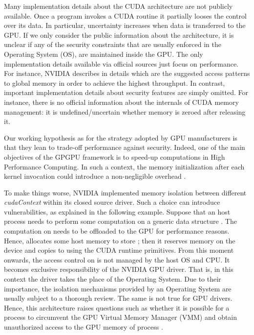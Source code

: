 \documentclass[11pt,onecolumn,letterpaper]{IEEEtran}
\begin{document}
Many implementation details about the CUDA architecture are not publicly available. 
Once a program invokes a CUDA routine it partially looses the control over its data. 
In particular, uncertainty increases when data is transferred to the GPU. 
If we only consider the public information about the architecture, 
it is unclear if any of the security constraints that are usually enforced in the Operating System (OS), 
are maintained inside the GPU.
The only implementation details available via official sources just focus on performance. 
For instance, NVIDIA describes in details which are the suggested access patterns to global memory in order to achieve the highest throughput.
In contrast, important implementation details about security features are simply omitted.
For instance,  there is no official information about the internals of CUDA memory management: it is undefined/uncertain whether memory is zeroed \cite{zeroizzazione2} after releasing it.

Our working hypothesis as for the strategy adopted by GPU manufacturers is that they lean to trade-off performance against security.
Indeed, one of the main objectives of the GPGPU framework is to speed-up computations in High Performance Computing.
In such a context, the memory initialization after each kernel invocation could introduce a non-negligible overhead \cite{zeroingoverhead}. 

To make things worse, NVIDIA implemented memory isolation between different \emph{cudaContext} within its closed source driver.
Such a choice can introduce vulnerabilities, as explained in the following example.
Suppose that an host process  needs to perform some computation on a generic data structure .
The computation on  needs to be offloaded to the GPU for performance reasons.
Hence,  allocates some host memory  to store ;
then it reserves memory on the device  and copies  to  using the CUDA runtime primitives.
From this moment onwards, the access control on  is not managed by the host OS and CPU.
It becomes exclusive responsibility of the NVIDIA GPU driver. 
That is, in this context the driver takes the place of the Operating System.
Due to their importance, the isolation mechanisms provided by an Operating System are usually subject to a thorough review.
The same is not true for GPU drivers.
Hence, this architecture raises questions such as whether it is possible for a process  to circumvent
the GPU Virtual Memory Manager (VMM) and obtain unauthorized access to the GPU memory of process . 
\end{document}
